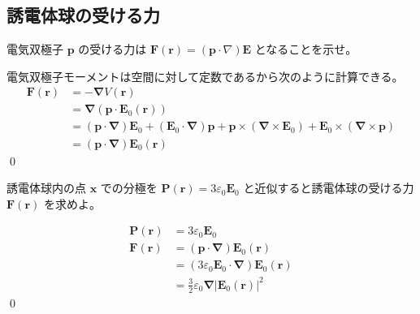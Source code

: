 \documentclass[uplatex,dvipdfmx,a4paper,11pt]{jlreq}
\makeatletter
\newcommand{\EE}{\bm{E}}
\newcommand{\rr}{\bm{r}}
\newcommand{\pp}{\bm{p}}
\newcommand{\vnabla}{\mathbf{\nabla}}
\numberwithin{equation}{section}
\theoremstyle{definition}
\renewenvironment{proof}[1][\proofname]{\par
  \normalfont
  \topsep6\p@\@plus6\p@ \trivlist
  \item[\hskip\labelsep{\bfseries #1}\@addpunct{\bfseries}]\ignorespaces\quad\par
}{%
  \qed\endtrivlist\@endpefalse
}
\renewcommand\proofname{証明}
\makeatother
\begin{document}
\subsection{誘電体球の受ける力}
\begin{problem}
電気双極子 $\pp$ の受ける力は $\bm{F}(\rr) = (\pp\cdot\nabla)\EE$ となることを示せ。
\end{problem}
\begin{proof}
  電気双極子モーメントは空間に対して定数であるから次のように計算できる。
  \begin{align}
    \bm{F}(\rr) & = -\vnabla V(\rr)                                                                                                 \\
                & = \vnabla(\pp\cdot\EE_0(\rr))                                                                                     \\
                & = (\pp\cdot\vnabla)\EE_0 + (\EE_0\cdot\vnabla)\pp + \pp\times(\vnabla\times\EE_0) + \EE_0\times(\vnabla\times\pp) \\
                & = (\pp\cdot\vnabla)\EE_0(\rr)
  \end{align}
\end{proof}

\begin{problem}
誘電体球内の点 $\bm{x}$ での分極を $\bm{P}(\rr) = 3\varepsilon_0\EE_0$ と近似すると誘電体球の受ける力 $\bm{F}(\rr)$ を求めよ。
\end{problem}
\begin{proof}
  \begin{align}
    \bm{P}(\rr) & = 3\varepsilon_0\EE_0                           \\
    \bm{F}(\rr) & = (\pp\cdot\vnabla)\EE_0(\rr)                   \\
                & = (3\varepsilon_0\EE_0\cdot\vnabla)\EE_0(\rr)   \\
                & = \frac{3}{2}\varepsilon_0\vnabla|\EE_0(\rr)|^2
  \end{align}
\end{proof}
\end{document}
